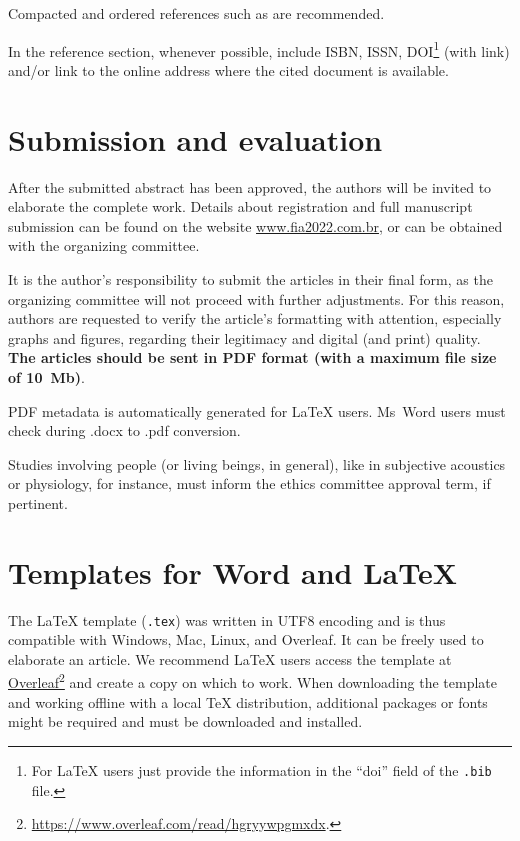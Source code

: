 \documentclass[12pt, a4paper, twoside, twocolumn]{article}
\begin{document}
Compacted and ordered references such as \cite{Mareze-2017,Oppenheim-1996,Muller-2001,Mareze-2019} are recommended.

In the reference section, whenever possible, include ISBN, ISSN, DOI\footnote{For LaTeX users just provide the information in the  ``doi'' field of the  \texttt{.bib} file.} (with link) and/or link to the online address where the cited document is available.

\section{Submission and evaluation}

After the submitted abstract has been approved, the authors will be invited to elaborate the complete work. Details about registration and full manuscript submission can be found on the website \url{www.fia2022.com.br}, or can be obtained with the organizing committee.

It is the author's responsibility to submit the articles in their final form, as the organizing committee will not proceed with further adjustments. For this reason, authors are requested to verify the article's formatting with attention, especially graphs and figures, regarding their legitimacy and digital (and print) quality. \textbf{The articles should be sent in PDF format (with a maximum file size of 10~Mb)}.

PDF metadata is automatically generated for \LaTeX\xspace users. Ms~Word users must check during .docx to .pdf conversion.

Studies involving people (or living beings, in general), like in subjective acoustics or physiology, for instance, must inform the ethics committee approval term, if pertinent.

\section{Templates for Word and \LaTeX}

The \LaTeX\xspace template (\texttt{.tex}) was written in UTF8 encoding and is thus compatible with Windows, Mac, Linux, and Overleaf. It can be freely used to elaborate an article. We recommend \LaTeX{} users access the template at \href{https://www.overleaf.com/read/hgryywpgmxdx}{Overleaf}\footnote{\url{https://www.overleaf.com/read/hgryywpgmxdx}.} and create a copy on which to work. When downloading the template and working offline with a local \TeX{} distribution, additional packages or fonts might be required and must be downloaded and installed.
\end{document}
